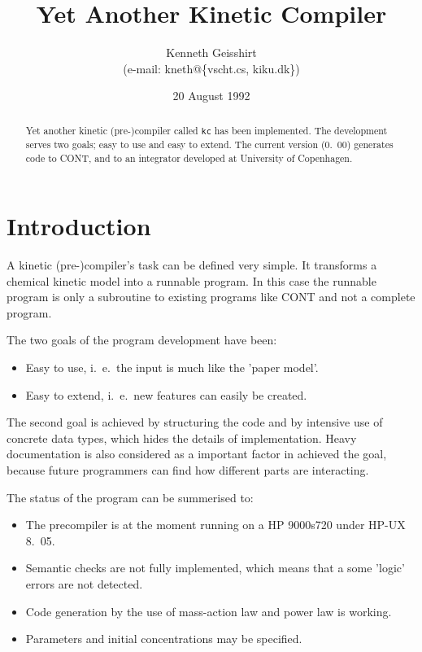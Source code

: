 \author{Kenneth Geisshirt \\ \small (e-mail: kneth@\{vscht.cs, kiku.dk\}) \normalsize}
\title{Yet Another Kinetic Compiler}
\date{20 August 1992}


\maketitle
\begin{abstract}
  Yet another kinetic (pre-)compiler called {\tt kc} has been implemented. The development serves
  two goals; easy to use and easy to extend. The current version (0.~00) generates
  code to CONT, \cite{marek} and to an integrator developed at University of Copenhagen.
\end{abstract}
\section{Introduction}
A kinetic (pre-)compiler's task can be defined very simple. It transforms a chemical
kinetic model into a runnable program. In this case the runnable program is only
a subroutine to existing programs like CONT and not a complete program.

The two goals of the program development have been: 
\begin{itemize}
  \item Easy to use, i.~e.~the input is much like the 'paper model'.
  \item Easy to extend, i.~e.~new features can easily be created.
\end{itemize}

The second goal is achieved by structuring the code and by intensive use of
concrete data types, which hides the details of implementation. Heavy documentation
is also considered as a important factor in achieved the goal, because future
programmers can find how different parts are interacting.

The status of the program can be summerised to:
\begin{itemize}
  \item The precompiler is at the moment running on a HP 9000s720 under HP-UX 8.~05. 
  \item Semantic checks are not fully implemented, which means that a some 'logic' 
        errors are not detected.
  \item Code generation by the use of mass-action law and power law is working.
  \item Parameters and initial concentrations may be specified. 
\end{itemize}

